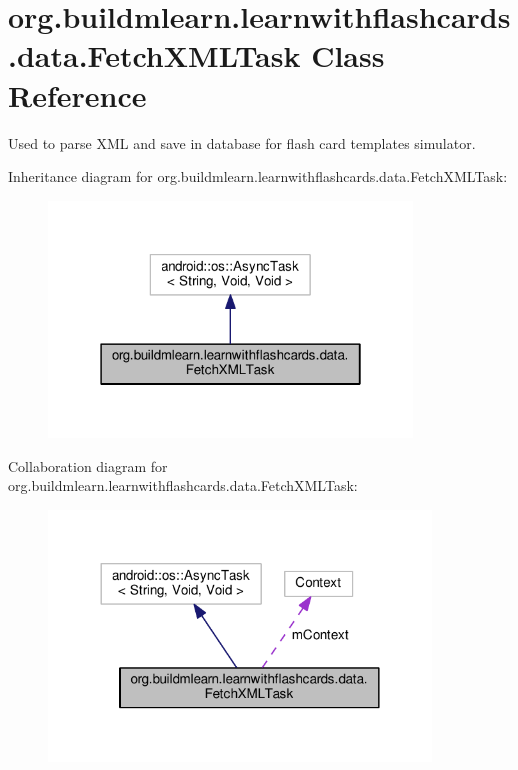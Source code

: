 \hypertarget{classorg_1_1buildmlearn_1_1learnwithflashcards_1_1data_1_1FetchXMLTask}{}\section{org.\+buildmlearn.\+learnwithflashcards.\+data.\+Fetch\+X\+M\+L\+Task Class Reference}
\label{classorg_1_1buildmlearn_1_1learnwithflashcards_1_1data_1_1FetchXMLTask}


Used to parse X\+ML and save in database for flash card template\textquotesingle{}s simulator.  




Inheritance diagram for org.\+buildmlearn.\+learnwithflashcards.\+data.\+Fetch\+X\+M\+L\+Task\+:
\nopagebreak
\begin{figure}[H]
\begin{center}
\leavevmode
\includegraphics[width=274pt]{classorg_1_1buildmlearn_1_1learnwithflashcards_1_1data_1_1FetchXMLTask__inherit__graph}
\end{center}
\end{figure}


Collaboration diagram for org.\+buildmlearn.\+learnwithflashcards.\+data.\+Fetch\+X\+M\+L\+Task\+:
\nopagebreak
\begin{figure}[H]
\begin{center}
\leavevmode
\includegraphics[width=288pt]{classorg_1_1buildmlearn_1_1learnwithflashcards_1_1data_1_1FetchXMLTask__coll__graph}
\end{center}
\end{figure}
